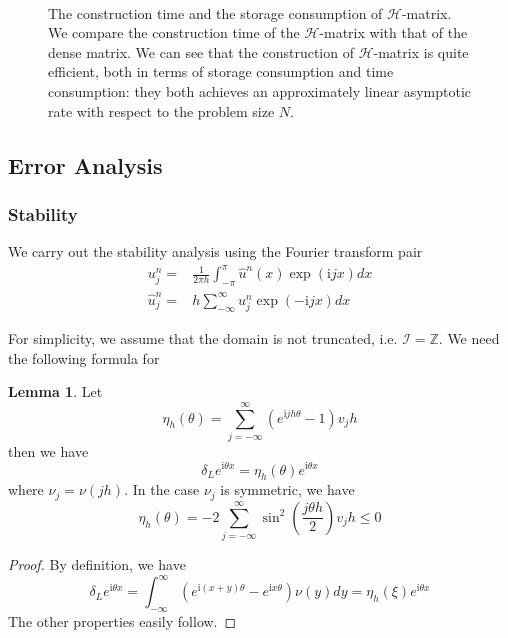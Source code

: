 \documentclass[10pt,a4paper]{article}
\newcommand{\ii}[0]{\mathrm{i}}
\theoremstyle{definition}
\newtheorem{lemma}{Lemma}
\begin{document}
\begin{figure}[htpb]
\centering
\scalebox{0.4}{}~
\scalebox{0.4}{}
\caption{The construction time and the storage consumption of $\mathcal{H}$-matrix. We compare the construction time of the $\mathcal{H}$-matrix with that of the dense matrix. We can see that the construction of $\mathcal{H}$-matrix is quite efficient, both in terms of storage consumption and time consumption: they both achieves an approximately linear asymptotic rate with respect to the problem size $N$.}
\label{fig:construction}
\end{figure}



\subsection{Error Analysis}

\subsubsection{Stability}
We carry out the stability analysis using the Fourier transform pair
\begin{align}
	u_j^n =& \frac{1}{2\pi h}\int_{-\pi}^\pi \hat u^n(x) \exp(\ii j x)dx\\
	\hat u_j^n =&  h \sum_{-\infty}^\infty u_j^n \exp(-\ii jx)dx
\end{align}

For simplicity, we assume that the domain is not truncated, i.e. $\mathcal{I}=\mathbb{Z}$. We need the following formula for 
\begin{lemma}
	Let 
	\begin{equation}
		\eta_h(\theta) = \sum_{j=-\infty}^\infty (e^{\ii jh\theta}-1)v_jh
	\end{equation}
	then we have
	\begin{equation}
		\delta_L e^{\ii \theta x} = \eta_h(\theta) e^{\ii \theta x}
	\end{equation}
	where $\nu_j = \nu(jh)$. In the case $\nu_j$ is symmetric, we have
	\begin{equation}
		\eta_h(\theta) = -2\sum_{j=-\infty}^\infty \sin^2\left(\frac{j\theta h}{2} \right) v_jh\leq 0
	\end{equation}
\end{lemma}
\begin{proof}
	By definition, we have
	\[{\delta _L}{e^{\ii\theta x}} = \int_{ - \infty }^\infty  {\left( {{e^{\ii(x + y)\theta }} - {e^{\ii x\theta }}} \right)\nu (y)dy = {\eta _h}(\xi )} {e^{\ii\theta x}}\]
	The other properties easily follow. 
\end{proof}
\end{document}
